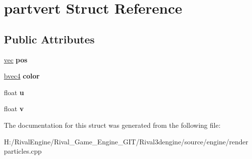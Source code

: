 \hypertarget{structpartvert}{}\section{partvert Struct Reference}
\label{structpartvert}
\subsection*{Public Attributes}
\begin{DoxyCompactItemize}
\item 
\mbox{\label{structpartvert_ac9c134d376a493896a30d71b1b41fa45}} 
\hyperlink{structvec}{vec} {\bfseries pos}
\item 
\mbox{\label{structpartvert_a8ef939167f0efbd198a6dff9a0d31809}} 
\hyperlink{structbvec4}{bvec4} {\bfseries color}
\item 
\mbox{\label{structpartvert_ae1433f5b94eb64e2b37b3537ca26faf7}} 
float {\bfseries u}
\item 
\mbox{\label{structpartvert_af8cac8517cc6afd481d317ce42a635c8}} 
float {\bfseries v}
\end{DoxyCompactItemize}


The documentation for this struct was generated from the following file\+:\begin{DoxyCompactItemize}
\item 
H\+:/\+Rival\+Engine/\+Rival\+\_\+\+Game\+\_\+\+Engine\+\_\+\+G\+I\+T/\+Rival3dengine/source/engine/renderparticles.\+cpp\end{DoxyCompactItemize}
